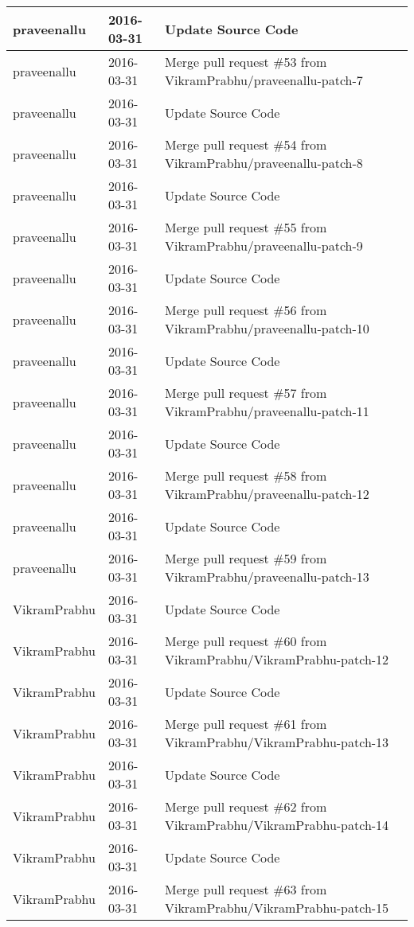 \documentclass[a4paper]{article}
\begin{document}
\begin{center}
\begin{longtable}{|l|l|l|}
praveenallu & 2016-03-31 & Update Source Code \\ \hline
praveenallu & 2016-03-31 & Merge pull request \#53 from VikramPrabhu/praveenallu-patch-7 \\ \hline
praveenallu & 2016-03-31 & Update Source Code \\ \hline
praveenallu & 2016-03-31 & Merge pull request \#54 from VikramPrabhu/praveenallu-patch-8 \\ \hline
praveenallu & 2016-03-31 & Update Source Code \\ \hline
praveenallu & 2016-03-31 & Merge pull request \#55 from VikramPrabhu/praveenallu-patch-9 \\ \hline
praveenallu & 2016-03-31 & Update Source Code \\ \hline
praveenallu & 2016-03-31 & Merge pull request \#56 from VikramPrabhu/praveenallu-patch-10 \\ \hline
praveenallu & 2016-03-31 & Update Source Code \\ \hline
praveenallu & 2016-03-31 & Merge pull request \#57 from VikramPrabhu/praveenallu-patch-11 \\ \hline
praveenallu & 2016-03-31 & Update Source Code \\ \hline
praveenallu & 2016-03-31 & Merge pull request \#58 from VikramPrabhu/praveenallu-patch-12 \\ \hline
praveenallu & 2016-03-31 & Update Source Code \\ \hline
praveenallu & 2016-03-31 & Merge pull request \#59 from VikramPrabhu/praveenallu-patch-13 \\ \hline
VikramPrabhu & 2016-03-31 & Update Source Code \\ \hline
VikramPrabhu & 2016-03-31 & Merge pull request \#60 from VikramPrabhu/VikramPrabhu-patch-12 \\ \hline
VikramPrabhu & 2016-03-31 & Update Source Code \\ \hline
VikramPrabhu & 2016-03-31 & Merge pull request \#61 from VikramPrabhu/VikramPrabhu-patch-13 \\ \hline
VikramPrabhu & 2016-03-31 & Update Source Code \\ \hline
VikramPrabhu & 2016-03-31 & Merge pull request \#62 from VikramPrabhu/VikramPrabhu-patch-14 \\ \hline
VikramPrabhu & 2016-03-31 & Update Source Code \\ \hline
VikramPrabhu & 2016-03-31 & Merge pull request \#63 from VikramPrabhu/VikramPrabhu-patch-15 \\ \hline

\end{longtable}
\end{center}
\end{document}
